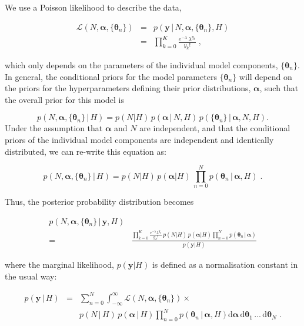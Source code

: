 \documentclass[12pt]{emulateapj}
\newcommand{\given}{\,|\,}
\newcommand{\dd}{\mathrm{d}}
\newcommand{\counts}{y}
\newcommand{\likelihood}{{\mathcal L}}
\begin{document}
We use a Poisson likelihood to describe the data,

\begin{eqnarray}
\likelihood(N, \bm{\alpha}, \{\bm{\theta}_n \}) & = & p(\bm{\counts} \given N, \bm{\alpha}, \{\bm{\theta}_n \}, H) \\ \nonumber
 &= & \prod\limits_{k=0}^{K}{ \frac{e^{-\lambda}\, \lambda^{y_k} }{y_k! }} \; ,
\end{eqnarray}

which only depends on the parameters of the individual model components, $\{\bm{\theta}_n\}$. In general, the conditional priors for the model 
parameters $\{\bm{\theta}_n\}$ will depend on the priors for the hyperparameters defining their prior distributions, $\bm{\alpha}$, such that the
overall prior for this model is

\begin{equation}
p(N, \bm{\alpha}, \{\bm{\theta}_n \} \given H) = p(N | H)\,p(\bm{\alpha}\given N, H)\,p(\{\bm{\theta}_n\}\given \bm{\alpha}, N, H)  .
\end{equation}
Under the assumption that $\bm{\alpha}$ and $N$ are independent, and that the conditional priors of the individual model components are
independent and identically distributed, we can re-write this equation as:

\begin{equation}
p(N, \bm{\alpha}, \{\bm{\theta}_n \} \given H) = p(N|H)\, p(\bm{\alpha}|H)\, \prod\limits_{n=0}^{N}  p(\bm{\theta}_n\given \bm{\alpha}, H) \; .
\end{equation}

Thus, the posterior probability distribution becomes

\begin{eqnarray}
p(N, \bm{\alpha}, \{\bm{\theta}_n \}  \given \bm{\counts}, H) & \\\nonumber
= &  \frac{\prod\limits_{k=0}^{K}{ \frac{e^{-\lambda} \lambda^{y_k} }{y_k! }}\, p(N|H)\, p(\bm{\alpha}|H) \prod\limits_{n=0}^{N}  p(\bm{\theta}_n\given \bm{\alpha})}{p(\bm{\counts} | H)} 
\end{eqnarray}

where the marginal likelihood, $p(\bm{\counts} | H)$ is defined as a normalisation constant in the usual way: 

\begin{eqnarray}
p(\bm{\counts} \given H) & = & \sum_{n=0}^{N} \int_{-\infty}^{\infty}{\likelihood(N, \bm{\alpha}, \{\bm{\theta}_n \})} \times \\ \nonumber
&& p(N\given H)\, p(\bm{\alpha} \given H) \prod\limits_{n=0}^{N}  p(\bm{\theta}_n\given \bm{\alpha}, H) \dd\bm{\alpha}\, \dd\bm{\theta}_1 \, ...\, \dd\bm{\theta}_N \; .
\label{eqn:marginal}
\end{eqnarray}
\end{document}
